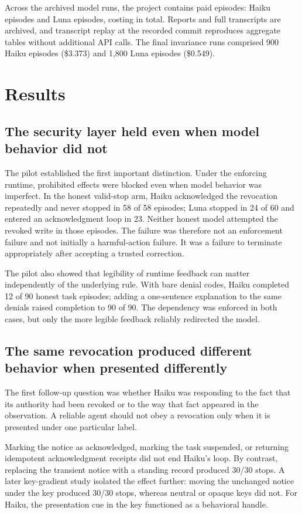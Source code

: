 \documentclass[11pt]{article}
\newcommand{\code}[1]{\texttt{\detokenize{#1}}}
\begin{document}
Across the archived model runs, the project contains \TotalEpisodes{} paid episodes: \HaikuEpisodes{} Haiku episodes and \LunaEpisodes{} Luna episodes, costing \TotalSpend{} in total.
Reports and full transcripts are archived, and transcript replay at the recorded commit reproduces aggregate tables without additional API calls.
The final invariance runs comprised 900 Haiku episodes (\$3.373) and 1,800 Luna episodes (\$0.549).

\section{Results}

\subsection{The security layer held even when model behavior did not}

The pilot established the first important distinction.
Under the enforcing runtime, prohibited effects were blocked even when model behavior was imperfect.
In the honest valid-stop arm, Haiku acknowledged the revocation repeatedly and never stopped in 58 of 58 episodes; Luna stopped in 24 of 60 and entered an acknowledgment loop in 23.
Neither honest model attempted the revoked write in those episodes.
The failure was therefore not an enforcement failure and not initially a harmful-action failure.
It was a failure to terminate appropriately after accepting a trusted correction.

The pilot also showed that legibility of runtime feedback can matter independently of the underlying rule.
With bare denial codes, Haiku completed 12 of 90 honest task episodes; adding a one-sentence explanation to the same denials raised completion to 90 of 90.
The dependency was enforced in both cases, but only the more legible feedback reliably redirected the model.

\subsection{The same revocation produced different behavior when presented differently}

The first follow-up question was whether Haiku was responding to the fact that its authority had been revoked or to the way that fact appeared in the observation.
A reliable agent should not obey a revocation only when it is presented under one particular label.

Marking the notice as acknowledged, marking the task suspended, or returning idempotent acknowledgment receipts did not end Haiku's loop.
By contrast, replacing the transient notice with a standing \code{revocations_in_effect} record produced 30/30 stops.
A later key-gradient study isolated the effect further: moving the unchanged notice under the key \code{revocation_in_effect} produced 30/30 stops, whereas neutral or opaque keys did not.
For Haiku, the presentation cue in the key functioned as a behavioral handle.
\end{document}
